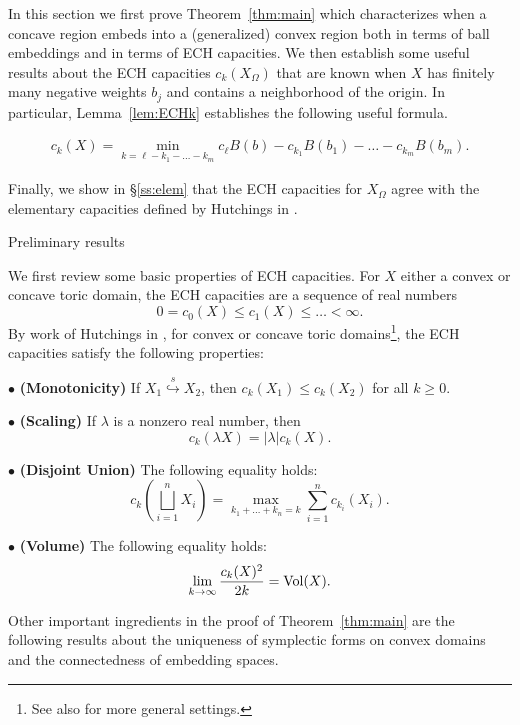 \documentclass[11pt, reqno]{amsart}
\makeatletter
\def\subsection{\@startsection{subsection}{2}%
  \z@{.75\linespacing\@plus.7\linespacing}{-.5em}%
  {\normalfont\large\bfseries}}
\theoremstyle{remark}
\numberwithin{equation}{subsection}
\numberwithin{figure}{section}
\theoremstyle{customremark}
\newcommand{\se}{{\stackrel{s}\hookrightarrow}}
\newcommand{\Vol}{{\rm Vol}}
\newcommand{\NI}{{\noindent}}
\newcommand{\Om}{{\Omega}}
\newcommand{\la}{{\lambda}}
\newcommand{\MS}{{\medskip}}
\makeatother
\begin{document}
In this section we first prove Theorem~\ref{thm:main} which characterizes when a concave region embeds into a (generalized) convex region both in terms of ball embeddings and in terms of ECH capacities.
We then establish some useful results about the ECH capacities $c_k(X_\Om)$ that are known when $X$ has  finitely many negative weights $b_j$ and contains a neighborhood of the origin. In particular, Lemma~\ref{lem:ECHk} establishes the following useful formula.

\begin{align}\label{eq:cECHk}
c_k(X) = \min_{k = \ell - k_1 - \ldots - k_m} c_\ell B(b) - c_{k_1} B(b_1) - \ldots - c_{k_m} B(b_m).
\end{align}

Finally, we show in \S\ref{ss:elem} that the ECH capacities for $X_\Om$ agree with the elementary capacities defined by Hutchings in \cite{Helem}.




\subsection{Preliminary results}\label{ss:prelim}

We first review some basic properties of ECH capacities. For $X$ either a convex or concave toric domain, the ECH capacities are a sequence of real numbers
\[ 0=c_0(X) \leq c_1(X) \leq \hdots < \infty.\] By work of Hutchings in \cite{Hutchq}, for convex or concave toric domains\footnote{See also \cite{ECH_volume} for more general settings.}, the ECH capacities satisfy the following properties:
\MS

\NI
$\bullet$ {\bf (Monotonicity)} If $X_1 \se X_2$, then $c_k(X_1) \leq c_k(X_2)$ for all $k \geq 0.$
\smallskip

\NI
$\bullet$    {\bf (Scaling)} If $\la$ is a nonzero real number, then
    \[ c_k(\la X)=|\la| c_k(X).\]

\NI $\bullet$ 
 {\bf (Disjoint Union)} The following equality holds:
    \[ c_k(\bigsqcup_{i=1}^n X_i)=\max_{k_1+\hdots+k_n=k} \sum_{i=1}^n c_{k_i}(X_i).\]

\NI $\bullet$  {\bf (Volume)} The following equality holds:  
    \[ \lim_{k \to \infty} \frac{c_k(X)^2}{2k}=\Vol(X).\]

\MS

Other important ingredients in the proof of Theorem~\ref{thm:main} are 
the  following  results about the uniqueness of symplectic forms on convex domains and the
 connectedness of embedding spaces. 
\end{document}
